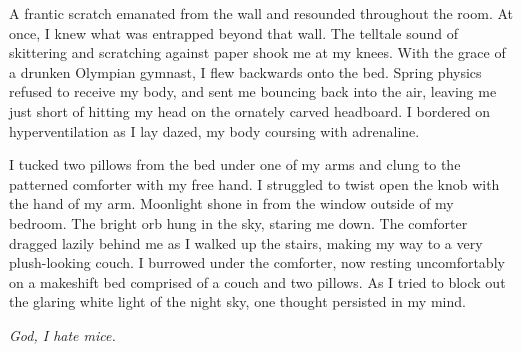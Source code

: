 \documentclass[12pt]{article}
\begin{document}
A frantic scratch emanated from the wall and resounded throughout the room.  At once, I knew what was entrapped beyond that wall.  The telltale sound of skittering and scratching against paper shook me at my knees.  With the grace of a drunken Olympian gymnast, I flew backwards onto the bed.  Spring physics refused to receive my body, and sent me bouncing back into the air, leaving me just short of hitting my head on the ornately carved headboard.  I bordered on hyperventilation as I lay dazed, my body coursing with adrenaline.

I tucked two pillows from the bed under one of my arms and clung to the patterned comforter with my free hand.  I struggled to twist open the knob with the hand of my arm.  Moonlight shone in from the window outside of my bedroom.  The bright orb hung in the sky, staring me down.  The comforter dragged lazily behind me as I walked up the stairs, making my way to a very plush-looking couch.  I burrowed under the comforter, now resting uncomfortably on a makeshift bed comprised of a couch and two pillows.  As I tried to block out the glaring white light of the night sky, one thought persisted in my mind.

\textit{God, I hate mice.}
\end{document}
